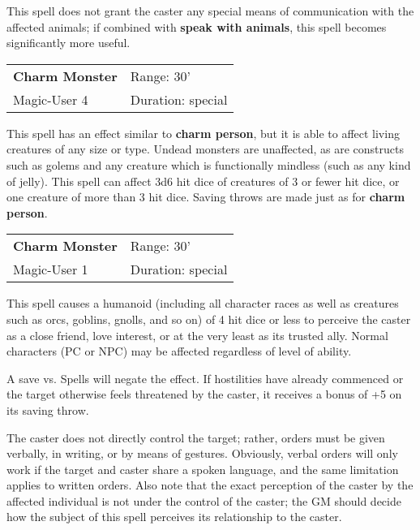 \documentclass[a4paper,twoside,openany,10pt]{book}
\begin{document}
\begin{multicols}{2}
This spell does not grant the caster any special means of communication with the affected animals; if combined with \textbf{speak with animals}, this spell becomes significantly more useful.

\smallskip\begin{flushleft} 
	\begin{tabularx}{0.45\textwidth}{@{}m{3.5cm}m{5.5cm}@{}} 
		\textbf{Charm Monster} & Range: 30'\\
		Magic-User 4 & Duration: special\\	
	\end{tabularx}\end{flushleft}

This spell has an effect similar to \textbf{charm person}, but it is able to affect living creatures of any size or type. Undead monsters are unaffected, as are constructs such as golems and any creature which is functionally mindless (such as any kind of jelly). This spell can affect 3d6 hit dice of creatures of 3 or fewer hit dice, or one creature of more than 3 hit dice. Saving throws are made just as for \textbf{charm person}.

\smallskip\begin{flushleft} 
	\begin{tabularx}{0.45\textwidth}{@{}m{3.5cm}m{5.5cm}@{}} 
		\textbf{Charm Monster} & Range: 30'\\
		Magic-User 1 & Duration: special\\	
	\end{tabularx}\end{flushleft}

This spell causes a humanoid (including all character races as well as creatures such as orcs, goblins, gnolls, and so on) of 4 hit dice or less to perceive the caster as a close friend, love interest, or at the very least as its trusted ally. Normal characters (PC or NPC) may be affected regardless of level of ability.

A save vs. Spells will negate the effect. If hostilities have already commenced or the target otherwise feels threatened by the caster, it receives a bonus of +5 on its saving throw. 

The caster does not directly control the target; rather, orders must be given verbally, in writing, or by means of gestures. Obviously, verbal orders will only work if the target and caster share a spoken language, and the same limitation applies to written orders. Also note that the exact perception of the caster by the affected individual is not under the control of the caster; the GM should decide how the subject of this spell perceives its relationship to the caster.


\end{multicols}
\end{document}
